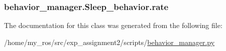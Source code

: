 \subsubsection[{\texorpdfstring{rate}{rate}}]{\setlength{\rightskip}{0pt plus 5cm}behavior\+\_\+manager.\+Sleep\+\_\+behavior.\+rate}\hypertarget{classbehavior__manager_1_1Sleep__behavior_a75cca73975838d3ee66cc687726685de}{}\label{classbehavior__manager_1_1Sleep__behavior_a75cca73975838d3ee66cc687726685de}


The documentation for this class was generated from the following file\+:\begin{DoxyCompactItemize}
\item 
/home/my\+\_\+ros/src/exp\+\_\+assignment2/scripts/\hyperlink{behavior__manager_8py}{behavior\+\_\+manager.\+py}\end{DoxyCompactItemize}
